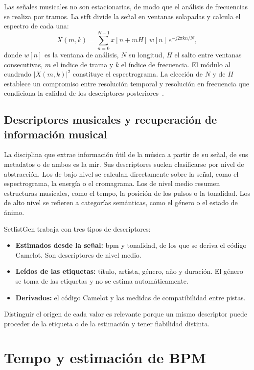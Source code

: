 Las señales musicales no son estacionarias, de modo que el análisis de frecuencias se realiza por tramos. La \acf{stft} divide la señal en ventanas solapadas y calcula el espectro de cada una:
\begin{equation}
  X(m,k) = \sum_{n=0}^{N-1} x[n + mH]\, w[n]\, e^{-j 2\pi k n / N},
  \label{eq:stft}
\end{equation}
donde $w[n]$ es la ventana de análisis, $N$ su longitud, $H$ el salto entre ventanas consecutivas, $m$ el índice de trama y $k$ el índice de frecuencia. El módulo al cuadrado $|X(m,k)|^2$ constituye el espectrograma. La elección de $N$ y de $H$ establece un compromiso entre resolución temporal y resolución en frecuencia que condiciona la calidad de los descriptores posteriores~\cite{muller2021fundamentals}.

\subsection{Descriptores musicales y recuperación de información musical}

La disciplina que extrae información útil de la música a partir de su señal, de sus metadatos o de ambos es la \acs{mir}. Sus descriptores suelen clasificarse por nivel de abstracción. Los de bajo nivel se calculan directamente sobre la señal, como el espectrograma, la energía o el cromagrama. Los de nivel medio resumen estructuras musicales, como el tempo, la posición de los pulsos o la tonalidad. Los de alto nivel se refieren a categorías semánticas, como el género o el estado de ánimo.

SetlistGen trabaja con tres tipos de descriptores:
\begin{itemize}
  \item \textbf{Estimados desde la señal:} \acs{bpm} y tonalidad, de los que se deriva el código Camelot. Son descriptores de nivel medio.
  \item \textbf{Leídos de las etiquetas:} título, artista, género, año y duración. El género se toma de las etiquetas y no se estima automáticamente.
  \item \textbf{Derivados:} el código Camelot y las medidas de compatibilidad entre pistas.
\end{itemize}
Distinguir el origen de cada valor es relevante porque un mismo descriptor puede proceder de la etiqueta o de la estimación y tener fiabilidad distinta.

\section{Tempo y estimación de BPM}
\label{sec:fund-bpm}

